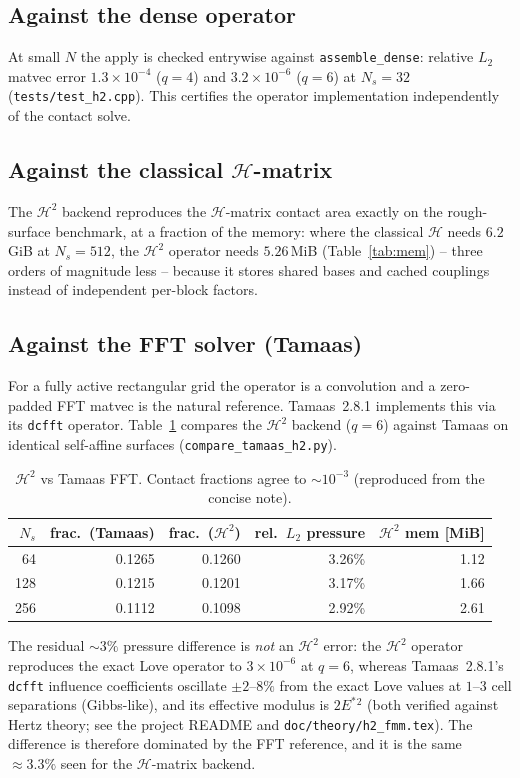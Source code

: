 \documentclass[11pt,a4paper]{article}
\newcommand{\Es}{E^{*}}
\newcommand{\Htwo}{\mathcal{H}^2}
\newcommand{\Hmat}{\mathcal{H}}
\newcommand{\code}[1]{\texttt{#1}}
\theoremstyle{definition}
\theoremstyle{remark}
\begin{document}
\subsection{Against the dense operator}
At small $N$ the apply is checked entrywise against \code{assemble\_dense}:
relative $L_2$ matvec error $1.3\times10^{-4}$ ($q=4$) and $3.2\times10^{-6}$
($q=6$) at $N_s=32$ (\code{tests/test\_h2.cpp}). This certifies the operator
implementation independently of the contact solve.

\subsection{Against the classical $\Hmat$-matrix}
The $\Htwo$ backend reproduces the $\Hmat$-matrix contact area exactly on the
rough-surface benchmark, at a fraction of the memory: where the classical
$\Hmat$ needs $6.2$\,GiB at $N_s=512$, the $\Htwo$ operator needs $5.26$\,MiB
(Table~\ref{tab:mem}) -- three orders of magnitude less -- because it stores
shared bases and cached couplings instead of independent per-block factors.

\subsection{Against the FFT solver (Tamaas)}
For a fully active rectangular grid the operator is a convolution and a
zero-padded FFT matvec is the natural reference. Tamaas~2.8.1 implements this via
its \code{dcfft} operator. Table~\ref{tab:tamaas} compares the $\Htwo$ backend
($q=6$) against Tamaas on identical self-affine surfaces
(\code{compare\_tamaas\_h2.py}).

\begin{table}[h]
\centering
\begin{tabular}{rrrrr}
\toprule
$N_s$ & frac.\ (Tamaas) & frac.\ ($\Htwo$) & rel.\ $L_2$ pressure & $\Htwo$ mem [MiB] \\
\midrule
64  & 0.1265 & 0.1260 & 3.26\% & 1.12 \\
128 & 0.1215 & 0.1201 & 3.17\% & 1.66 \\
256 & 0.1112 & 0.1098 & 2.92\% & 2.61 \\
\bottomrule
\end{tabular}
\caption{$\Htwo$ vs Tamaas FFT. Contact fractions agree to $\sim10^{-3}$
(reproduced from the concise note).}
\label{tab:tamaas}
\end{table}

The residual $\sim3\%$ pressure difference is \emph{not} an $\Htwo$ error: the
$\Htwo$ operator reproduces the exact Love operator to $3\times10^{-6}$ at $q=6$,
whereas Tamaas~2.8.1's \code{dcfft} influence coefficients oscillate $\pm2$--$8\%$
from the exact Love values at $1$--$3$ cell separations (Gibbs-like), and its
effective modulus is $2\Es{}^2$ (both verified against Hertz theory; see the
project README and \code{doc/theory/h2\_fmm.tex}). The difference is therefore
dominated by the FFT reference, and it is the same $\approx3.3\%$ seen for the
$\Hmat$-matrix backend.
\end{document}
